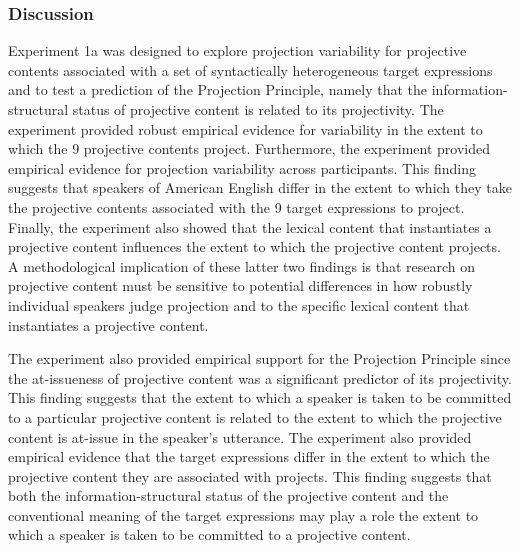 \documentclass[11pt,fleqn]{article}
\newcommand{\6}{\mbox{$[\hspace*{-.6mm}[$}}
\newcommand{\9}{\mbox{$]\hspace*{-.6mm}]$}}
\newcommand{\jd}[1]{\textbf{\color{Green}[jd: #1]}}
\begin{document}
%
%
%
%
%
%


\subsubsection{Discussion}\label{s-discussion1a}

Experiment 1a was designed to explore projection variability for projective contents associated with a set of syntactically heterogeneous target expressions and to test a prediction of the Projection Principle, namely that the information-structural status of projective content is related to its projectivity. The experiment provided robust empirical evidence for variability in the extent to which the 9 projective contents project. Furthermore, the experiment provided empirical evidence for projection variability across participants. This finding suggests that speakers of American English differ in the extent to which they take the projective contents associated with the 9 target expressions to project. Finally, the experiment also showed that the lexical content that instantiates a projective content influences the extent to which the projective content projects. A methodological implication of these latter two findings is that research on projective content must be sensitive to potential differences in how robustly individual speakers judge projection and to the specific lexical content that instantiates a projective content.

The experiment also provided empirical support for the Projection Principle since the at-issueness of projective content was a significant predictor of its projectivity. This finding suggests that the extent to which a speaker is taken to be committed to a particular projective content is related to the extent to which the projective content is at-issue in the speaker's utterance. The experiment also provided empirical evidence that the target expressions differ in the extent to which the projective content they are associated with projects. This finding suggests that both the information-structural status of the projective content and the conventional meaning of the target expressions may play a role the extent to which a speaker is taken to be committed to a projective content.
\end{document}
